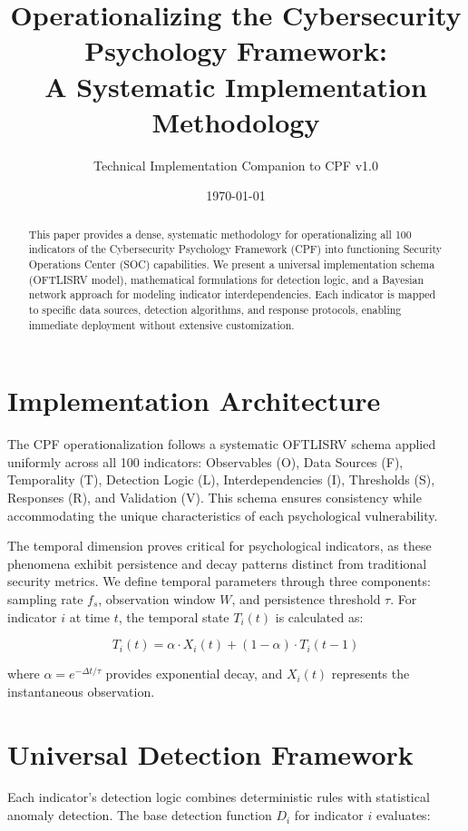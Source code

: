 \documentclass[10pt, twocolumn]{article}
\title{Operationalizing the Cybersecurity Psychology Framework:\\A Systematic Implementation Methodology}
\author{Technical Implementation Companion to CPF v1.0}
\date{\today}
\begin{document}
\maketitle

\begin{abstract}
This paper provides a dense, systematic methodology for operationalizing all 100 indicators of the Cybersecurity Psychology Framework (CPF) into functioning Security Operations Center (SOC) capabilities. We present a universal implementation schema (OFTLISRV model), mathematical formulations for detection logic, and a Bayesian network approach for modeling indicator interdependencies. Each indicator is mapped to specific data sources, detection algorithms, and response protocols, enabling immediate deployment without extensive customization.
\end{abstract}

\section{Implementation Architecture}

The CPF operationalization follows a systematic OFTLISRV schema applied uniformly across all 100 indicators: Observables (O), Data Sources (F), Temporality (T), Detection Logic (L), Interdependencies (I), Thresholds (S), Responses (R), and Validation (V). This schema ensures consistency while accommodating the unique characteristics of each psychological vulnerability.

The temporal dimension proves critical for psychological indicators, as these phenomena exhibit persistence and decay patterns distinct from traditional security metrics. We define temporal parameters through three components: sampling rate $f_s$, observation window $W$, and persistence threshold $\tau$. For indicator $i$ at time $t$, the temporal state $T_i(t)$ is calculated as:

$$T_i(t) = \alpha \cdot X_i(t) + (1-\alpha) \cdot T_i(t-1)$$

where $\alpha = e^{-\Delta t/\tau}$ provides exponential decay, and $X_i(t)$ represents the instantaneous observation.

\section{Universal Detection Framework}

Each indicator's detection logic combines deterministic rules with statistical anomaly detection. The base detection function $D_i$ for indicator $i$ evaluates:
\end{document}

